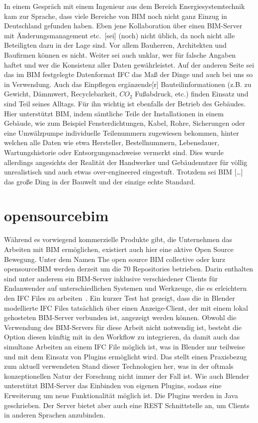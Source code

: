In einem Gespräch mit einem Ingenieur aus dem Bereich \glqq{}Energiesystemtechnik\grqq{} kam zur Sprache, dass viele Bereiche von BIM noch nicht ganz Einzug in Deutschland gefunden haben.
Eben jene \glqq{}Kollaboration über einen BIM-Server mit Änderungsmanagement etc.\ [sei] (noch) nicht üblich, da noch nicht alle Beteiligten dazu in der Lage sind. Vor allem Bauherren, Architekten und Baufirmen können es nicht\grqq{}.
Weiter sei \glqq{}auch unklar, wer für falsche Angaben haftet und wer die Konsistenz aller Daten gewährleistet\grqq{}.
Auf der anderen Seite sei \glqq{}das im BIM festgelegte Datenformat IFC das Maß der Dinge und auch bei uns so in Verwendung\grqq{}.
Auch das Einpflegen \glqq{}ergänzende[r] Bauteilinformationen (z.B. zu Gewicht, Dämmwert, Recyclebarkeit, \(CO_2\) Fußabdruck, etc.)\grqq{} finden Einsatz und sind Teil seines Alltags.
Für ihn wichtig ist ebenfalls der Betrieb des Gebäudes.
Hier unterstützt BIM, indem sämtliche Teile der Installationen in einem Gebäude, wie zum Beispiel Fensterdichtungen, Kabel, Rohre, Sicherungen oder eine Umwälzpumpe individuelle Teilenummern zugewiesen bekommen, hinter welchen alle Daten wie etwa Hersteller, Bestellnummern, Lebensdauer, Wartungshistorie oder Entsorgungsnachweise vermerkt sind.
Dies wurde allerdings \glqq{}angesichts der Realität der Handwerker und Gebäudenutzer für völlig unrealistisch und auch etwas over-engineered\grqq{} eingestuft.
Trotzdem sei \glqq{}BIM [\ldots] das große Ding in der Bauwelt und der einzige echte Standard\grqq{}.

\section{opensourcebim}
Während es vorwiegend kommerzielle Produkte gibt, die Unternehmen das Arbeiten mit BIM ermöglichen, existiert auch hier eine aktive Open Source Bewegung.
Unter dem Namen \glqq{}The open source BIM collective\grqq{} oder kurz \glqq{}opensourceBIM\grqq{} werden derzeit um die 70 Repositories betrieben.
Darin enthalten sind unter anderem ein BIM-Server inklusive verschiedener Clients für Endanwender auf unterschiedlichen Systemen und Werkzeuge, die es erleichtern den IFC Files zu arbeiten~\cite{Theopens96:online}.
Ein kurzer Test hat gezeigt, dass die in Blender modellierte IFC Files tatsächlich über einen \glqq{}Anzeige-Client\grqq{}, der mit einem lokal gehosteten BIM-Server verbunden ist, angezeigt werden können.
Obwohl die Verwendung des BIM-Servers für diese Arbeit nicht notwendig ist, besteht die Option diesen künftig mit in den Workflow zu integrieren, da damit auch das simultane Arbeiten an einem IFC File möglich ist, was in Blender nur teilweise und mit dem Einsatz von Plugins ermöglicht wird.
Das stellt einen Praxisbezug zum aktuell verwendeten Stand dieser Technologien her, was in der oftmals konzeptionellen Natur der Forschung nicht immer der Fall ist.
Wie auch Blender unterstützt BIM-Server das Einbinden von eigenen Plugins, sodass eine Erweiterung um neue Funktionalität möglich ist.
Die Plugins werden in Java geschrieben.
Der Server bietet aber auch eine REST Schnittstelle an, um Clients in anderen Sprachen anzubinden.

